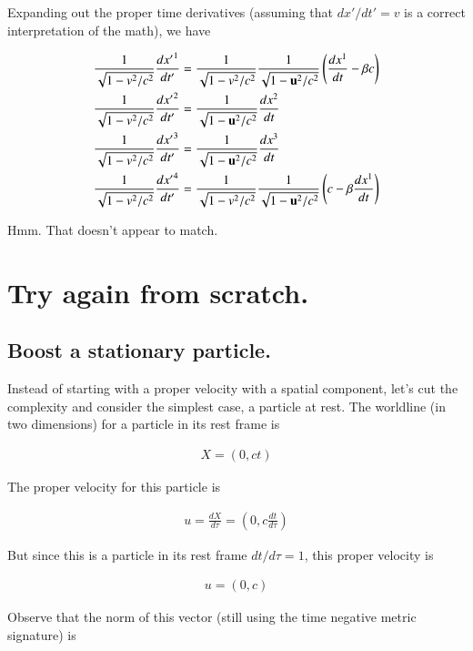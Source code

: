 \documentclass{article}
\begin{document}
Expanding out the proper time derivatives (assuming that $dx'/dt' = v$ is a correct interpretation of the math), we have

\begin{align*}
\frac{1}{\sqrt{1 - v^2/c^2}} \frac{{dx'}^1}{dt'} &= \frac{1}{\sqrt{1 - v^2/c^2}} \frac{1}{\sqrt{1 - \mathbf{u}^2/c^2}} \left( \frac{dx^1}{dt} - \beta c \right) \\
\frac{1}{\sqrt{1 - v^2/c^2}} \frac{{dx'}^2}{dt'} &= \frac{1}{\sqrt{1 - \mathbf{u}^2/c^2}} \frac{dx^2}{dt} \\
\frac{1}{\sqrt{1 - v^2/c^2}} \frac{{dx'}^3}{dt'} &= \frac{1}{\sqrt{1 - \mathbf{u}^2/c^2}} \frac{dx^3}{dt} \\
\frac{1}{\sqrt{1 - v^2/c^2}} \frac{{dx'}^4}{dt'} &= \frac{1}{\sqrt{1 - v^2/c^2}} \frac{1}{\sqrt{1 - \mathbf{u}^2/c^2}} \left( c - \beta \frac{dx^1}{dt} \right)
\end{align*}

Hmm.  That doesn't appear to match.

\section{Try again from scratch. }

\subsection{Boost a stationary particle. }

Instead of starting with a proper velocity with a spatial component, let's cut the complexity and consider the simplest case, a particle at rest.  The worldline (in two dimensions) for a particle in its rest frame is

\begin{align*}
X = (0, ct) 
\end{align*}

The proper velocity for this particle is 

\begin{align*}
u = \frac{dX}{d\tau} = \left(0, c\frac{dt}{d\tau} \right) 
\end{align*}

But since this is a particle in its rest frame $dt/d\tau = 1$, this proper velocity is

\begin{align*}
u = \left(0, c \right) 
\end{align*}

Observe that the norm of this vector (still using the time negative metric signature) is
\end{document}
